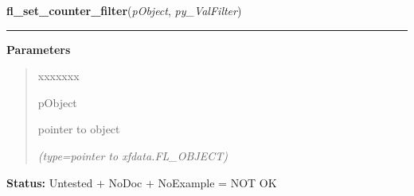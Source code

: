 \hspace{.8\funcindent}\begin{boxedminipage}{\funcwidth}

    \raggedright \textbf{fl\_set\_counter\_filter}(\textit{pObject}, \textit{py\_ValFilter})

    \vspace{-1.5ex}

    \rule{\textwidth}{0.5\fboxrule}
\setlength{\parskip}{2ex}
\setlength{\parskip}{1ex}
      \textbf{Parameters}
      \vspace{-1ex}

      \begin{quote}
        \begin{Ventry}{xxxxxxx}

          \item[pObject]

          pointer to object

            {\it (type=pointer to xfdata.FL\_OBJECT)}

        \end{Ventry}

      \end{quote}

\textbf{Status:} Untested + NoDoc + NoExample = NOT OK



    \end{boxedminipage}

    \label{xformslib:library:fl_get_counter_repeat}

    \vspace{0.5ex}

